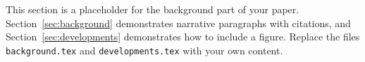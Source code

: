 
This section is a placeholder for the background part of your paper.
Section~\ref{sec:background} demonstrates narrative paragraphs with
citations, and Section~\ref{sec:developments} demonstrates how to include a
figure. Replace the files \texttt{background.tex} and
\texttt{developments.tex} with your own content.

